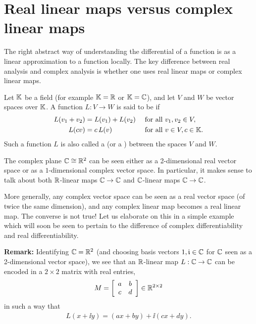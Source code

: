 \section{Real linear maps versus complex linear maps}

The right abstract way of understanding the differential of a function is as a linear
approximation to a function locally. The key difference between real analysis and
complex analysis is whether one uses real linear maps or complex linear maps.

\begin{definition}
  \label{def:linear}
  \uses{}
  Let $\mathbb{K}$ be a field (for example $\mathbb{K} = \mathbb{R}$ or $\mathbb{K} = \mathbb{C}$), and let
  $V$ and $W$ be vector spaces over $\mathbb{K}$. A function $L : V \to W$ is
  said to be  if
  \begin{align*}
    L(v_1 + v_2) = \; & L(v_1) + L(v_2) & & \text{ for all } v_1, v_2 \in V, \\
    L(c v) = \; & c \, L(v) & & \text{ for all } v \in V, c \in \mathbb{K} .
  \end{align*}
  Such a function $L$ is also called a  (or a
  ) between the spaces $V$ and $W$.
\end{definition}

The complex plane $\mathbb{C} \cong \mathbb{R}^2$ can be seen either as a 2-dimensional real vector space
or as a $1$-dimensional complex vector space. In particular, it makes sense to talk about
both $\mathbb{R}$-linear maps $\mathbb{C} \to \mathbb{C}$ and $\mathbb{C}$-linear maps $\mathbb{C} \to \mathbb{C}$.

More generally, any complex vector space can be seen as a real vector space
(of twice the same dimension), and any complex linear map becomes a real linear map.
The converse is not true! Let us elaborate on this in a simple example which
will soon be seen to pertain to the difference of complex differentiability
and real differentiability.

\textbf{Remark:} Identifying $\mathbb{C} = \mathbb{R}^2$ (and choosing basis vectors $1, \mathfrak{i} \in \mathbb{C}$
for $\mathbb{C}$ seen as a 2-dimensional vector space), we see that an
$\mathbb{R}$-linear map $L : \mathbb{C} \to \mathbb{C}$ can be encoded in a $2 \times 2$ matrix with real entries,
\begin{align*}
  M = \left[ \begin{array}{cc} a & b \\ c & d \end{array} \right] \in \mathbb{R}^{2 \times 2}
\end{align*}
in such a way that
\begin{align*}
  L (x + \ii y) = (a x + b y) + \ii (c x + d y) .
\end{align*}

